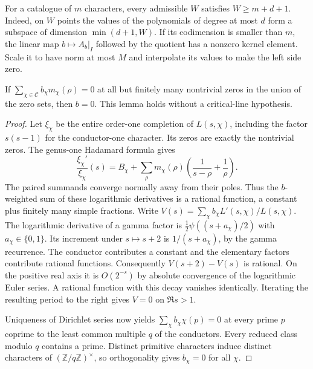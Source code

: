 For a catalogue of $m$ characters, every admissible $W$ satisfies
$W\ge m+d+1$. Indeed, on $W$ points the values of the polynomials of
degree at most $d$ form a subspace of dimension $\min(d+1,W)$.
If its codimension is smaller than $m$, the linear map $b\mapsto A_b|_I$
followed by the quotient has a nonzero kernel element. Scale it to have
norm at most $M$ and interpolate its values to make the left side zero.

\begin{lemma}\label{lem:logr}
If $\sum_{\chi\in\mathcal C} b_\chi m_\chi(\rho)=0$ at all but finitely
many nontrivial zeros in the union of the zero sets, then $b=0$.
This lemma holds without a critical-line hypothesis.
\end{lemma}

\begin{proof}
Let $\xi_\chi$ be the entire order-one completion of $L(s,\chi)$, including
the factor $s(s-1)$ for the conductor-one character. Its zeros are exactly
the nontrivial zeros. The genus-one Hadamard formula gives
\[
  \frac{\xi_\chi'}{\xi_\chi}(s)
   =B_\chi+\sum_\rho m_\chi(\rho)
     \left(\frac{1}{s-\rho}+\frac{1}{\rho}\right).
\]
The paired summands converge normally away from their poles. Thus the
$b$-weighted sum of these logarithmic derivatives is a rational function,
a constant plus finitely many simple fractions. Write
$V(s)=\sum_\chi b_\chi L'(s,\chi)/L(s,\chi)$. The logarithmic derivative
of a gamma factor is $\tfrac12\psi((s+a_\chi)/2)$ with
$a_\chi\in\{0,1\}$. Its increment under $s\mapsto s+2$ is
$1/(s+a_\chi)$, by the gamma recurrence. The conductor contributes a
constant and the elementary factors contribute rational functions.
Consequently $V(s+2)-V(s)$ is rational. On the positive real axis it is
$O(2^{-s})$ by absolute convergence of the logarithmic Euler series.
A rational function with this decay vanishes identically.
Iterating the resulting period to the right gives $V=0$ on $\Re s>1$.

Uniqueness of Dirichlet series now yields
$\sum_\chi b_\chi\chi(p)=0$ at every prime $p$ coprime to the least
common multiple $q$ of the conductors. Every reduced class modulo $q$
contains a prime. Distinct primitive characters induce distinct characters
of $(\mathbb Z/q\mathbb Z)^\times$, so orthogonality gives $b_\chi=0$
for all $\chi$.
\end{proof}

